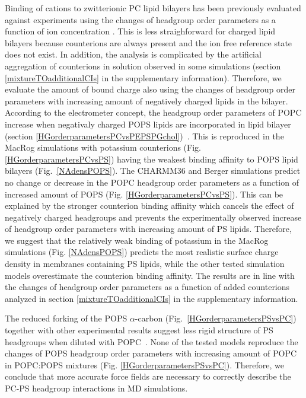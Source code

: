 \documentclass[aps,prl,superscriptaddress,twocolumn]{revtex4}
\begin{document}
Binding of cations to zwitterionic PC lipid bilayers has been previously
evaluated against experiments using the changes of headgroup order parameters
as a function of ion concentration \cite{catte16}. This is less straighforward
for charged lipid bilayers because counterions are always present and the
ion free reference state does not exist.
In addition, the analysis is complicated by the artificial aggregation of counterions
in solution observed in some simulations (section \ref{mixtureTOadditionalCIs} in the supplementary information).
Therefore, we evaluate the amount of bound charge also using the changes of
headgroup order parameters with increasing amount of negatively charged lipids in the bilayer.
According to the electrometer concept, the headgroup order parameters of POPC
increase when negativaly charged POPS lipids are incorporated in lipid bilayer
(section \ref{HGorderparametersPCvsPEPSPGchol})~\cite{seelig87,scherer87}.
This is reproduced in the MacRog simulations with potassium counterions (Fig. \ref{HGorderparametersPCvsPS})
having the weakest binding affinity to POPS lipid bilayers (Fig.~\ref{NAdensPOPS}).
The CHARMM36 and Berger simulations predict no change or decrease
in the POPC headgroup order parameters as a function of increased amount of POPS (Fig. \ref{HGorderparametersPCvsPS}).
This can be explained by the stronger counterion binding affinity which cancels
the effect of negatively charged headgroups and prevents the experimentally observed
increase of headgroup order parameters with increasing amount of PS lipids.
Therefore, we suggest that the relatively weak binding of potassium
in the MacRog simulations (Fig. \ref{NAdensPOPS}) predicts the most
realistic surface charge density in membranes containing PS lipids,
while the other tested simulation models overestimate the counterion
binding affinity. The results are in line with the changes of headgroup order
parameters as a function of added counterions analyzed in section \ref{mixtureTOadditionalCIs}
in the supplementary information.

The reduced forking of the POPS $\alpha$-carbon (Fig.~\ref{HGorderparametersPSvsPC})
together with other experimental results suggest less rigid structure of PS headgroups when diluted with
POPC~\cite{browning80,buldt81,roux90,roux91,scherer87}.
None of the tested models reproduce the changes of POPS headgroup order
parameters with increasing amount of POPC in POPC:POPS mixtures (Fig. \ref{HGorderparametersPSvsPC}).
Therefore, we conclude that more accurate force fields are necessary
to correctly describe the PC-PS headgroup interactions in MD simulations.
\end{document}
